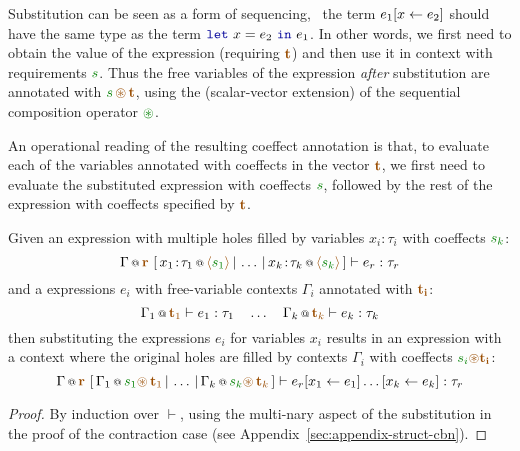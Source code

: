 Substitution can be seen as a form of sequencing, \ie~the term $e_1[x \leftarrow e_2]$ should have
the same type as the term $\kvd{let}~x=e_2~\kvd{in}~e_1$. In other words, we first need to obtain the
value of the expression (requiring $\aclrd{\textbf{t}}$) and then use it in context with
requirements $\cclrd{s}$. Thus the free variables of the expression \emph{after} substitution
are annotated with $\cclrd{s} \,\aseq\, \aclrd{\textbf{t}}$, using the (scalar-vector extension)
of the sequential composition operator $\cseq$.

An operational reading of the resulting coeffect annotation is that, to evaluate each of the variables
annotated with coeffects in the vector $\aclrd{\textbf{t}}$, we first need to evaluate the substituted
expression with coeffects $\cclrd{s}$, followed by the rest of the expression with coeffects specified
by $\aclrd{\textbf{t}}$.

\begin{lemma}
\label{thm:structural-substitution}
Given an expression with multiple holes filled by variables $x_i\!:\!\tau_i$ with coeffects $\cclrd{s_k}$:
%
\begin{equation*}
\coctx{\Gamma}{\aclrd{\textbf{r}}}~[\,\coctx{x_1\!:\!\tau_1}{\alift{\cclrd{s_1}}} \,|\, \ldots \,|\,
  \coctx{x_k\!:\!\tau_k}{\alift{\cclrd{s_k}}}\,] \vdash e_r : \tau_r
\end{equation*}
%
and a expressions $e_i$ with free-variable contexts $\Gamma_i$ annotated with $\aclrd{\mathbf{t_i}}$:
%
\begin{equation*}
\coctx{\Gamma_1}{\aclrd{\textbf{t}_1}} \vdash e_1 : \tau_1
\quad \ldots \quad
\coctx{\Gamma_k}{\aclrd{\textbf{t}_k}} \vdash e_k : \tau_k
\end{equation*}
%
then substituting the expressions $e_i$ for variables $x_i$ results in an expression with a context
where the original holes are filled by contexts $\Gamma_i$ with coeffects $\cclrd{s_i} \aseq \aclrd{\mathbf{t_i}}$:
%
\begin{equation*}
\coctx{\Gamma}{\aclrd{\textbf{r}}}~[\,\coctx{\Gamma_1}{\cclrd{s_1}\aseq\,\aclrd{\textbf{t}_1}} \,|\, \ldots \,|\,
  \coctx{\Gamma_k}{\cclrd{s_k}\aseq\,\aclrd{\textbf{t}_k}}\,] \vdash \subst{\subst{e_r}{x_1}{e_1}\ldots}{x_k}{e_k} : \tau_r
\end{equation*}
\end{lemma}
\begin{proof}
By induction over $\vdash$, using the multi-nary aspect of the substitution
in the proof of the contraction case (see Appendix~\ref{sec:appendix-struct-cbn}).
\end{proof}

